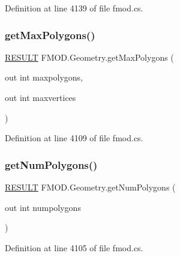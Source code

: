 Definition at line 4139 of file fmod.\+cs.

\mbox{\label{class_f_m_o_d_1_1_geometry_a19177e49f9de1cd6d5c0ae50ae147da8}} 
\subsubsection{\texorpdfstring{get\+Max\+Polygons()}{getMaxPolygons()}}
{\footnotesize\ttfamily \hyperlink{namespace_f_m_o_d_a305d1176ef3f8c8815861a60407ac33d}{R\+E\+S\+U\+LT} F\+M\+O\+D.\+Geometry.\+get\+Max\+Polygons (\begin{DoxyParamCaption}\item[{out int}]{maxpolygons,  }\item[{out int}]{maxvertices }\end{DoxyParamCaption})}



Definition at line 4109 of file fmod.\+cs.

\mbox{\label{class_f_m_o_d_1_1_geometry_a71e2d84a9cd5e4fff67cf8a25b92c471}} 
\subsubsection{\texorpdfstring{get\+Num\+Polygons()}{getNumPolygons()}}
{\footnotesize\ttfamily \hyperlink{namespace_f_m_o_d_a305d1176ef3f8c8815861a60407ac33d}{R\+E\+S\+U\+LT} F\+M\+O\+D.\+Geometry.\+get\+Num\+Polygons (\begin{DoxyParamCaption}\item[{out int}]{numpolygons }\end{DoxyParamCaption})}



Definition at line 4105 of file fmod.\+cs.

\mbox{\label{class_f_m_o_d_1_1_geometry_a5993fb0a4a428a9de5262a6254daeeef}} 
